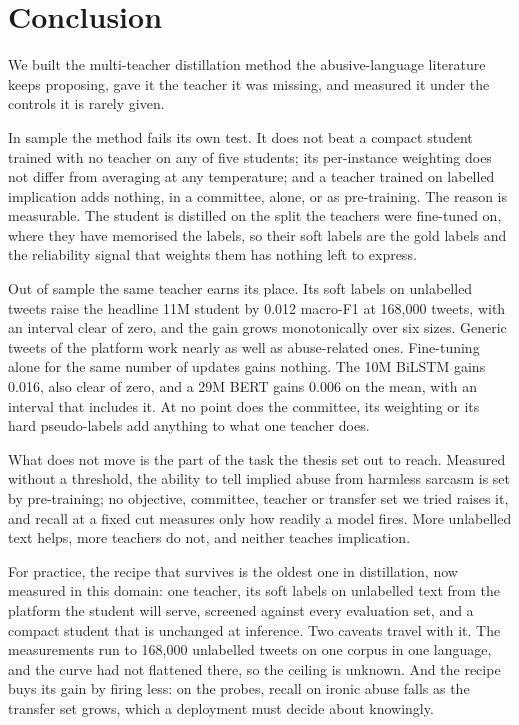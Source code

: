 \chapter{Conclusion}
\label{ch:8}
We built the multi-teacher distillation method the abusive-language literature keeps proposing, gave
it the teacher it was missing, and measured it under the controls it is rarely given.

In sample the method fails its own test. It does not beat a compact student trained with no teacher
on any of five students; its per-instance weighting does not differ from averaging at any
temperature; and a teacher trained on labelled implication adds nothing, in a committee, alone, or
as pre-training. The reason is measurable. The student is distilled on the split the teachers were
fine-tuned on, where they have memorised the labels, so their soft labels are the gold labels and
the reliability signal that weights them has nothing left to express.

Out of sample the same teacher earns its place. Its soft labels on unlabelled tweets raise the
headline 11M student by 0.012 macro-F1 at 168,000 tweets, with an interval clear of zero, and the
gain grows monotonically over six sizes. Generic tweets of the platform work nearly as well as
abuse-related ones. Fine-tuning alone for the same number of updates gains nothing. The 10M BiLSTM
gains 0.016, also clear of zero, and a 29M BERT gains 0.006 on the mean, with an interval that
includes it. At no point does the committee, its weighting or its hard pseudo-labels add anything to
what one teacher does.

What does not move is the part of the task the thesis set out to reach. Measured without a
threshold, the ability to tell implied abuse from harmless sarcasm is set by pre-training; no
objective, committee, teacher or transfer set we tried raises it, and recall at a fixed cut measures
only how readily a model fires. More unlabelled text helps, more teachers do not, and neither
teaches implication.

For practice, the recipe that survives is the oldest one in distillation, now measured in this
domain: one teacher, its soft labels on unlabelled text from the platform the student will serve,
screened against every evaluation set, and a compact student that is unchanged at inference. Two
caveats travel with it. The measurements run to 168,000 unlabelled tweets on one corpus in one
language, and the curve had not flattened there, so the ceiling is unknown. And the recipe buys its
gain by firing less: on the probes, recall on ironic abuse falls as the transfer set grows, which a
deployment must decide about knowingly.
